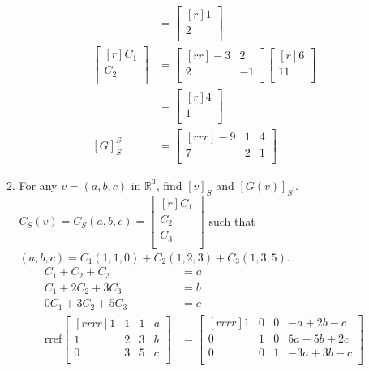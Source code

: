 \documentclass[12pt]{article}
\theoremstyle{definition}
\theoremstyle{plain}
\begin{document}
\begin{enumerate}
\begin{enumerate}
\begin{align*}
		&=\begin{bmatrix}[r]1\\2\\\end{bmatrix}\\
		\begin{bmatrix}[r]C_1\\C_2\\\end{bmatrix}&=\begin{bmatrix}[rr]-3&2\\2&-1\\\end{bmatrix}\begin{bmatrix}[r]6\\11\\\end{bmatrix}\\
		&=\begin{bmatrix}[r]4\\1\\\end{bmatrix}\\
		[G]_{S^\prime}^S&=\begin{bmatrix}[rrr]-9&1&4\\7&2&1\\\end{bmatrix}
		\end{align*}
	\item For any $v=(a,b,c)$ in $\mathbb{R}^3$, find $[v]_S$ and $[G(v)]_{S^\prime}$.\\
		$C_S(v)=C_S(a,b,c)=\begin{bmatrix}[r]C_1\\C_2\\C_3\\\end{bmatrix}$ such that $(a,b,c)=C_1(1,1,0)+C_2(1,2,3)+C_3(1,3,5)$.
		\begin{align*}
		C_1+C_2+C_3 &= a\\
		C_1+2C_2+3C_3 &=b\\
		0C_1+3C_2+5C_3&=c\\
		\mathrm{rref}\begin{bmatrix}[rrrr]1&1&1&a\\1&2&3&b\\0&3&5&c\\\end{bmatrix} &= \begin{bmatrix}[rrrr]1&0&0&-a+2b-c\\0&1&0&5a-5b+2c\\0&0&1&-3a+3b-c\\\end{bmatrix}\\

\end{align*}
\end{enumerate}
\end{enumerate}
\end{document}

